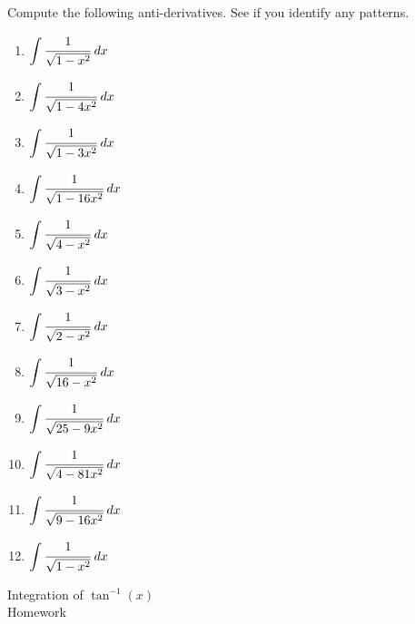 \documentclass[12pt, letterpaper]{report}
\newcommand{\0}{\emptyset}
\theoremstyle{theorem}
\theoremstyle{definition}
\theoremstyle{definition}
\theoremstyle{definition}
\theoremstyle{definition}
\theoremstyle{theorem}
\theoremstyle{theorem}
\theoremstyle{remark}
\begin{document}
Compute the following anti-derivatives.  See if you identify any patterns.
\begin{multicols}{3}
\bfseries{\begin{Large}
	\begin{enumerate}
		\item $\displaystyle\int \cfrac{1}{\sqrt{1-x^2}} \; dx$
		\vspace{3cm}
		\item $\displaystyle\int \cfrac{1}{\sqrt{1-4x^2}} \; dx$
		\vspace{3cm}
		\item $\displaystyle\int \cfrac{1}{\sqrt{1-3x^2}} \; dx$
		\vspace{3cm}
		\item $\displaystyle\int \cfrac{1}{\sqrt{1-16x^2}} \; dx$
		\vspace{3cm}
		\item $\displaystyle\int \cfrac{1}{\sqrt{4-x^2}} \; dx$
		\vspace{3cm}
		\item $\displaystyle\int \cfrac{1}{\sqrt{3-x^2}} \; dx$
		\vspace{3cm}
		\item $\displaystyle\int \cfrac{1}{\sqrt{2-x^2}} \; dx$
		\vspace{3cm}
		\item $\displaystyle\int \cfrac{1}{\sqrt{16-x^2}} \; dx$
		\vspace{3cm}
		\item $\displaystyle\int \cfrac{1}{\sqrt{25-9x^2}} \; dx$
		\vspace{3cm}
		\item $\displaystyle\int \cfrac{1}{\sqrt{4-81x^2}} \; dx$
		\vspace{3cm}
		\item $\displaystyle\int \cfrac{1}{\sqrt{9-16x^2}} \; dx$
		\vspace{3cm}
		\item $\displaystyle\int \cfrac{1}{\sqrt{1-x^2}} \; dx$
	\end{enumerate}
\end{Large}}

\end{multicols}


\newpage
\begin{center}
\Large Integration of $\tan^{-1}(x)$\\ Homework
\end{center}
\end{document}
